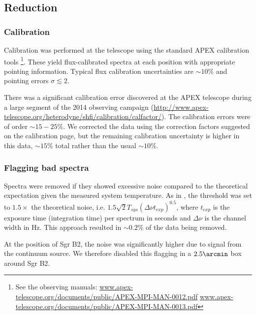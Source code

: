 \subsection{Reduction}
\subsubsection{Calibration}
Calibration was performed at the telescope using the standard APEX calibration
tools
\footnote{See the observing manuals:
\url{www.apex-telescope.org/documents/public/APEX-MPI-MAN-0012.pdf}
\url{www.apex-telescope.org/documents/public/APEX-MPI-MAN-0013.pdf} }.
These yield flux-calibrated spectra at each position with appropriate pointing
information.  Typical flux calibration uncertainties are $\sim10\%$ and
pointing errors $\sigma\lesssim2$\arcsec. %

There was a significant calibration error discovered at the APEX telescope during
a large segment of the 2014 observing campaign
(\url{http://www.apex-telescope.org/heterodyne/shfi/calibration/calfactor/}).
The calibration errors were of order $\sim15-25\%$.  We corrected the data using
the correction factors suggested on the calibration page, but the remaining
calibration uncertainty is higher in this data, $\sim15\%$ total rather than
the usual $\sim10\%$.

\subsubsection{Flagging bad spectra}
\label{sec:flagging}
Spectra were removed if they showed excessive noise compared to the
theoretical expectation given the measured system temperature.  As in
\citet{Ao2013a}, the threshold was set to $1.5\times$ the theoretical noise,
i.e. $1.5 \sqrt{2} T_{sys} (\Delta\nu t_{exp})^{0.5}$, where $t_{exp}$ is the
exposure time (integration time) per spectrum in seconds and $\Delta\nu$ is the
channel width in Hz.  This approach resulted in $\sim0.2\%$ of the data being
removed.  

At the position of Sgr B2, the noise was significantly higher due to signal
from the continuum source.  We therefore disabled this flagging in a
$2.5\arcmin$ box around Sgr B2.



